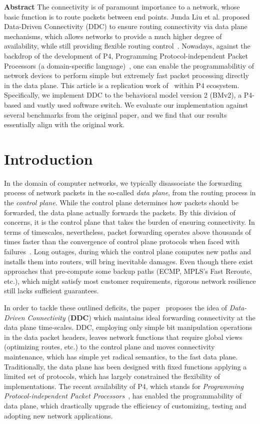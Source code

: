 \textbf{Abstract} The connectivity is of paramount importance to a network, whose basic function is to route packets between end points.  
Junda Liu et al. proposed Data-Driven Connectivity (DDC) to ensure routing connectivity via data plane mechanisms, which allows networks to provide a much higher degree of availability, while still providing flexible routing control~\cite{liu2013ensuring}.
Nowadays, against the backdrop of the development of P4, Programming Protocol-independent Packet Processors (a domain-specific language)~\cite{P4}, one can enable the programmabilitiy of network devices to perform simple but extremely fast packet processing directly in the data plane.
This article is a replication work of~\cite{liu2013ensuring} within P4 ecosystem. 
Specifically, we implement DDC to the behavioral model version 2 (BMv2), a P4-based and vastly used software switch. We evaluate our implementation against several benchmarks from the original paper, and we find that our results essentially align with the original work.  

\section{Introduction}

In the domain of computer networks, we typically disassociate the forwarding process of network packets in the so-called \textit{data plane}, from the routing process in the \textit{control plane}. 
While the control plane determines how packets should be forwarded, the data plane actually forwards the packets. 
By this division of concerns, it is the control plane that takes the burden of ensuring connectivity.  
In terms of timescales, nevertheless, packet forwarding operates above thousands of times faster than the convergence of control plane protocols when faced with failures~\cite{liu2013ensuring}. 
Long outages, during which the control plane computes new paths and installs them into routers, will bring inevitable damages. 
Even though there exist approaches that pre-compute some backup paths (ECMP, MPLS's Fast Reroute, etc.), which might satisfy most customer requirements, rigorous network resilience still lacks sufficient guarantees.

In order to tackle these outlined deficits, the paper~\cite{liu2013ensuring} proposes the idea of \textit{Data-Driven Connectivity} (\textbf{DDC}) which maintains ideal forwarding connectivity at the data plane time-scales. 
DDC, employing only simple bit manipulation operations in the data packet headers, leaves network functions that require global views (optimizing routes, etc.) to the control plane and moves connectivity maintenance, which has simple yet radical semantics, to the fast data plane. 
Traditionally, the data plane has been designed with fixed functions applying a limited set of protocols, which has largely constrained the flexibility of implementations. 
The recent availability of P4, which stands for \textit{Programming Protocol-independent Packet Processors}~\cite{P4}, has enabled the programmability of data plane, which drastically upgrade the efficiency of customizing, testing and adopting new network applications. 

